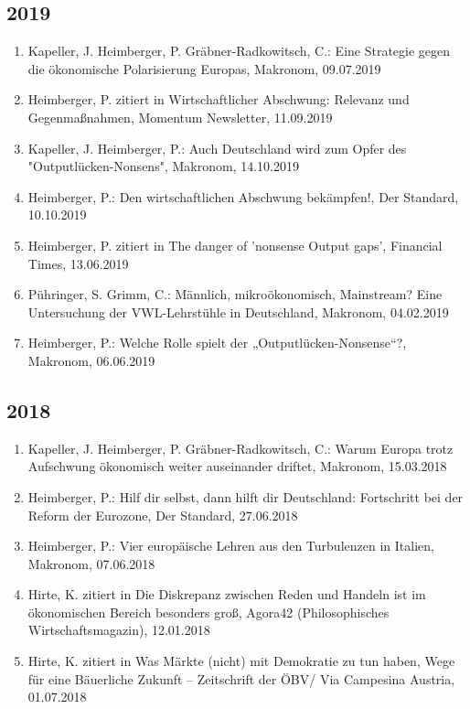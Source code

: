 \subsection*{2019}
\begin{enumerate}
	 \item Kapeller, J. Heimberger, P. Gräbner-Radkowitsch, C.: Eine Strategie gegen die ökonomische Polarisierung Europas, Makronom, 09.07.2019
	 \item Heimberger, P. zitiert in Wirtschaftlicher Abschwung: Relevanz und Gegenmaßnahmen, Momentum Newsletter, 11.09.2019
	 \item Kapeller, J. Heimberger, P.: Auch Deutschland wird zum Opfer des "Outputlücken-Nonsens", Makronom, 14.10.2019
	 \item Heimberger, P.: Den wirtschaftlichen Abschwung bekämpfen!, Der Standard, 10.10.2019
	 \item Heimberger, P. zitiert in The danger of 'nonsense Output gaps', Financial Times, 13.06.2019
	 \item Pühringer, S. Grimm, C.: Männlich, mikroökonomisch, Mainstream? Eine Untersuchung der VWL-Lehrstühle in Deutschland, Makronom, 04.02.2019
	 \item Heimberger, P.: Welche Rolle spielt der „Outputlücken-Nonsense“?, Makronom, 06.06.2019
\end{enumerate}
\subsection*{2018}
\begin{enumerate}
	 \item Kapeller, J. Heimberger, P. Gräbner-Radkowitsch, C.: Warum Europa trotz Aufschwung ökonomisch weiter auseinander driftet, Makronom, 15.03.2018
	 \item Heimberger, P.: Hilf dir selbst, dann hilft dir Deutschland: Fortschritt bei der Reform der Eurozone, Der Standard, 27.06.2018
	 \item Heimberger, P.: Vier europäische Lehren aus den Turbulenzen in Italien, Makronom, 07.06.2018
	 \item Hirte, K. zitiert in Die Diskrepanz zwischen Reden und Handeln ist im ökonomischen Bereich besonders groß, Agora42 (Philosophisches Wirtschaftsmagazin), 12.01.2018
	 \item Hirte, K. zitiert in Was Märkte (nicht) mit Demokratie zu tun haben, Wege für eine Bäuerliche Zukunft – Zeitschrift der ÖBV/ Via Campesina Austria, 01.07.2018
\end{enumerate}
